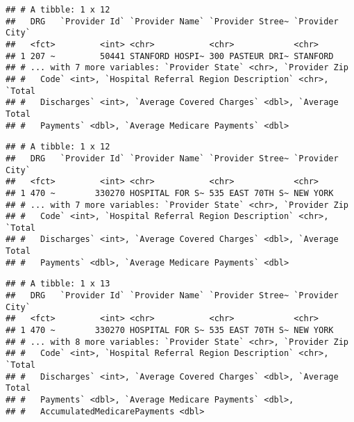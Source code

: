 \documentclass[]{article}
\newenvironment{Shaded}{\begin{snugshade}}{\end{snugshade}}
\newcommand{\KeywordTok}[1]{\textcolor[rgb]{0.13,0.29,0.53}{\textbf{#1}}}
\newcommand{\DataTypeTok}[1]{\textcolor[rgb]{0.13,0.29,0.53}{#1}}
\newcommand{\StringTok}[1]{\textcolor[rgb]{0.31,0.60,0.02}{#1}}
\newcommand{\OperatorTok}[1]{\textcolor[rgb]{0.81,0.36,0.00}{\textbf{#1}}}
\newcommand{\NormalTok}[1]{#1}
\begin{document}
\begin{verbatim}
## # A tibble: 1 x 12
##   DRG   `Provider Id` `Provider Name` `Provider Stree~ `Provider City`
##   <fct>         <int> <chr>           <chr>            <chr>          
## 1 207 ~         50441 STANFORD HOSPI~ 300 PASTEUR DRI~ STANFORD       
## # ... with 7 more variables: `Provider State` <chr>, `Provider Zip
## #   Code` <int>, `Hospital Referral Region Description` <chr>, `Total
## #   Discharges` <int>, `Average Covered Charges` <dbl>, `Average Total
## #   Payments` <dbl>, `Average Medicare Payments` <dbl>
\end{verbatim}

\begin{Shaded}
\end{Shaded}

\begin{verbatim}
## # A tibble: 1 x 12
##   DRG   `Provider Id` `Provider Name` `Provider Stree~ `Provider City`
##   <fct>         <int> <chr>           <chr>            <chr>          
## 1 470 ~        330270 HOSPITAL FOR S~ 535 EAST 70TH S~ NEW YORK       
## # ... with 7 more variables: `Provider State` <chr>, `Provider Zip
## #   Code` <int>, `Hospital Referral Region Description` <chr>, `Total
## #   Discharges` <int>, `Average Covered Charges` <dbl>, `Average Total
## #   Payments` <dbl>, `Average Medicare Payments` <dbl>
\end{verbatim}

\begin{Shaded}
\end{Shaded}

\begin{verbatim}
## # A tibble: 1 x 13
##   DRG   `Provider Id` `Provider Name` `Provider Stree~ `Provider City`
##   <fct>         <int> <chr>           <chr>            <chr>          
## 1 470 ~        330270 HOSPITAL FOR S~ 535 EAST 70TH S~ NEW YORK       
## # ... with 8 more variables: `Provider State` <chr>, `Provider Zip
## #   Code` <int>, `Hospital Referral Region Description` <chr>, `Total
## #   Discharges` <int>, `Average Covered Charges` <dbl>, `Average Total
## #   Payments` <dbl>, `Average Medicare Payments` <dbl>,
## #   AccumulatedMedicarePayments <dbl>
\end{verbatim}
\end{document}

